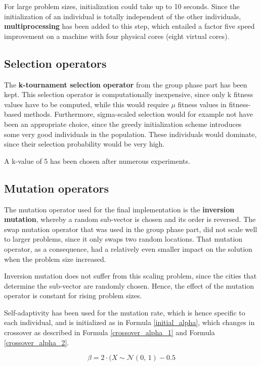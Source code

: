 \documentclass[a4paper,10pt]{article}
\begin{document}
For large problem sizes, initialization could take up to 10 seconds. Since the initialization of an individual is totally independent of the other individuals, \textbf{multiprocessing} has been added to this step, which entailed a factor five speed improvement on a machine with four physical cores (eight virtual cores).


\subsection{Selection operators}
\label{selection}
The \textbf{k-tournament selection operator} from the group phase part has been kept. This selection operator is computationally inexpensive, since only k fitness values have to be computed, while this would require $\mu$ fitness values in fitness-based methods. Furthermore, sigma-scaled selection would for example not have been an appropriate choice, since the greedy initialization scheme introduces some very good individuals in the population. These individuals would dominate, since their selection probability would be very high.

A k-value of 5 has been chosen after numerous experiments.

\subsection{Mutation operators}
\label{mutation}
The mutation operator used for the final implementation is the \textbf{inversion mutation}, whereby a random sub-vector is chosen and its order is reversed. The swap mutation operator that was used in the group phase part, did not scale well to larger problems, since it only swaps two random locations. That mutation operator, as a consequence, had a relatively even smaller impact on the solution when the problem size increased.

Inversion mutation does not suffer from this scaling problem, since the cities that determine the sub-vector are randomly chosen. Hence, the effect of the mutation operator is constant for rising problem sizes.  

Self-adaptivity has been used for the mutation rate, which is hence specific to each individual, and is initialized as in Formula \ref{initial_alpha}, which changes in crossover as described in Formula \ref{crossover_alpha_1} and Formula \ref{crossover_alpha_2}.

\begin{equation}
    \label{crossover_alpha_1}
    \beta = 2 \cdot (X \sim \mathcal{N}(0,\,1) - 0.5
\end{equation}
\end{document}
